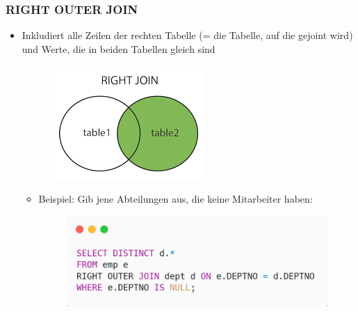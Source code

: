 \subsubsection{RIGHT OUTER JOIN}
\begin{itemize}
    \item Inkludiert alle Zeilen der rechten Tabelle (= die Tabelle, auf die gejoint wird) und Werte, die in beiden Tabellen gleich sind
    \begin{figure}[H]
        \centering
        \includegraphics{res/themenkorb_2/joins_right_outer_join.png} 
    \end{figure}
    \begin{itemize}
        \item Beispiel: Gib jene Abteilungen aus, die keine Mitarbeiter haben:
        \begin{figure}[H]
            \centering 
            \includegraphics[scale=.45]{res/themenkorb_2/joins_right_outer_join_example.png}
        \end{figure}
    \end{itemize}
\end{itemize}

